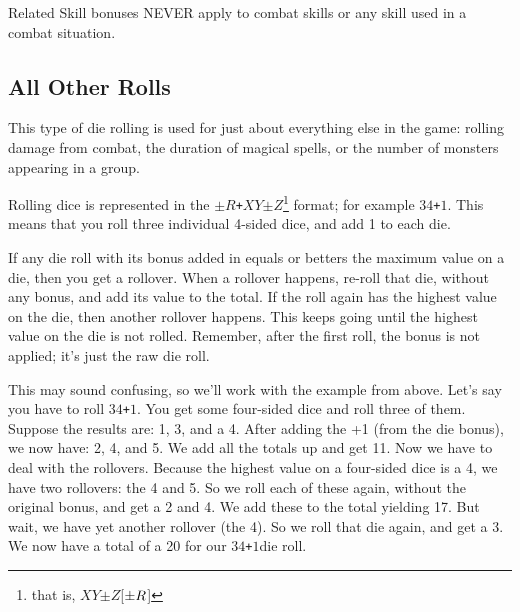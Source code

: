 \documentclass[twoside]{book}
\begin{document}
  
    {  
     Related Skill bonuses NEVER apply to combat skills
               or any skill used in a combat situation. 
    }
  
    

\subsection{All Other Rolls}
    
    {  
     This type of die rolling is used for just about
               everything else in the game: rolling damage from combat,
               the duration of magical spells, or the number of monsters
               appearing in a group. 
    }
  
    {  
     Rolling dice is represented in the
                \texttt{\ensuremath{\pm}}\ensuremath{R}\texttt{+}\ensuremath{X}\ensuremath{Y}\texttt{\ensuremath{\pm}}\ensuremath{Z}\footnote{ that is,
                \ensuremath{X}\ensuremath{Y}\texttt{\ensuremath{\pm}}\ensuremath{Z}[\ensuremath{\texttt{\ensuremath{\pm}}\ensuremath{R}}]} format; for
               example \ensuremath{3}\ensuremath{4}\texttt{+}\ensuremath{1}. This means that you roll three individual
               4-sided dice, and add 1 to each die. 
    }
  
    {  
     If any die roll with its bonus added in equals or
               betters the maximum value on a die, then you get a
               rollover. When a rollover happens, re-roll that die,
               without any bonus, and add its value to the total. If the
               roll again has the highest value on the die, then another
               rollover happens. This keeps going until the highest value
               on the die is not rolled. Remember, after the first roll,
               the bonus is not applied; it's just the raw die
               roll. 
    }
  
    {  
     This may sound confusing, so we'll work with
               the example from above. Let's say you have to roll
               \ensuremath{3}\ensuremath{4}\texttt{+}\ensuremath{1}. You get some four-sided dice and roll three of
               them. Suppose the results are: 1, 3, and a 4. After adding
               the +1 (from the die bonus), we now have: 2, 4, and 5. We
               add all the totals up and get 11. Now we have to deal with
               the rollovers. Because the highest value on a four-sided
               dice is a 4, we have two rollovers: the 4 and 5. So we
               roll each of these again, without the original bonus, and
               get a 2 and 4. We add these to the total yielding 17. But
               wait, we have yet another rollover (the 4). So we roll
               that die again, and get a 3. We now have a total of a 20
               for our \ensuremath{3}\ensuremath{4}\texttt{+}\ensuremath{1}die roll. 
    }
  
\end{document}
